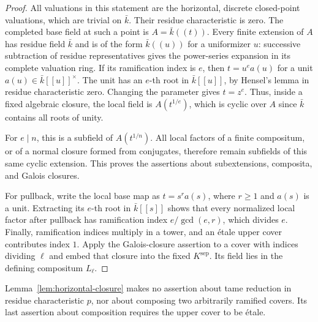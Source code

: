 \begin{proof}
All valuations in this statement are the horizontal, discrete
closed-point valuations, which are trivial on $\bar k$.  Their residue
characteristic is zero.  The completed base field at such a point is
$A=\bar k((t))$.  Every finite extension of $A$ has residue field
$\bar k$ and is of the form $\bar k((u))$ for a uniformizer $u$:
successive subtraction of residue representatives gives the power-series
expansion in its complete valuation ring.  If its ramification index is
$e$, then $t=u^e a(u)$ for a unit $a(u)\in\bar k[[u]]^\times$.
The unit has an $e$-th root in $\bar k[[u]]$, by Hensel's lemma in
residue characteristic zero.  Changing the parameter gives
$t=z^e$.  Thus, inside a fixed algebraic closure, the local field is
$A(t^{1/e})$, which is cyclic over $A$ since $\bar k$ contains all roots
of unity.

For $e\mid n$, this is a subfield of $A(t^{1/n})$.  All local factors
of a finite compositum, or of a normal closure formed from conjugates,
therefore remain subfields of this same cyclic extension.  This proves
the assertions about subextensions, composita, and Galois closures.

For pullback, write the local base map as $t=s^r a(s)$, where $r\ge1$
and $a(s)$ is a unit.  Extracting its $e$-th root in $\bar k[[s]]$
shows that every normalized local factor after pullback has ramification
index $e/\gcd(e,r)$, which divides $e$.  Finally, ramification indices
multiply in a tower, and an étale upper cover contributes index $1$.
Apply the Galois-closure assertion to a cover with indices dividing
$\ell$ and embed that closure into the fixed $K^{\mathrm{sep}}$.
Its field lies in the defining compositum $L_\ell$.
\end{proof}

\begin{remark}
Lemma~\ref{lem:horizontal-closure} makes no assertion about tame
reduction in residue characteristic $p$, nor about composing two
arbitrarily ramified covers.  Its last assertion about composition
requires the upper cover to be étale.
\end{remark}
